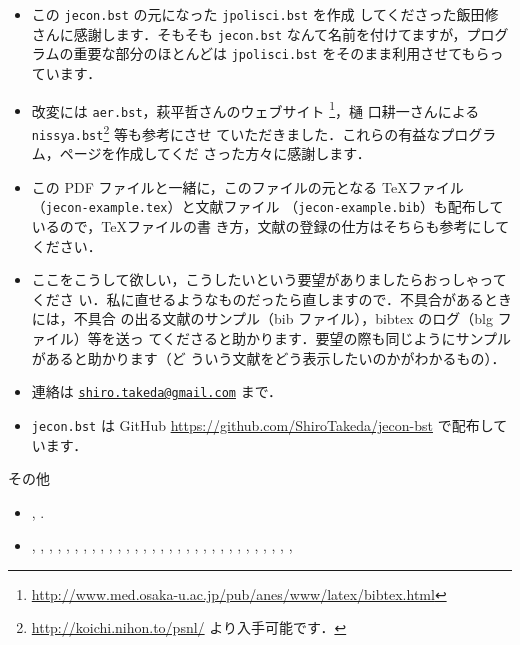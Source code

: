 \documentclass[article]{jlreq}
\begin{document}
\begin{itemize}
 \item この \texttt{jecon.bst} の元になった \texttt{jpolisci.bst} を作成
       してくださった飯田修さんに感謝します．そもそも \texttt{jecon.bst} 
       なんて名前を付けてますが，プログラムの重要な部分のほとんどは
       \texttt{jpolisci.bst} をそのまま利用させてもらっています．
 \item 改変には \texttt{aer.bst}，萩平哲さんのウェブサイト
       \footnote{
       \url{http://www.med.osaka-u.ac.jp/pub/anes/www/latex/bibtex.html}}，樋
       口耕一さんによる \texttt{nissya.bst}\footnote{
       \url{http://koichi.nihon.to/psnl/} より入手可能です．} 等も参考にさせ
       ていただきました．これらの有益なプログラム，ページを作成してくだ
       さった方々に感謝します．
 \item この PDF ファイルと一緒に，このファイルの元となる \TeX ファイル 
      （\texttt{jecon-example.tex}）と文献ファイル 
      （\texttt{jecon-example.bib}）も配布しているので，\TeX ファイルの書
       き方，文献の登録の仕方はそちらも参考にしてください．
 \item ここをこうして欲しい，こうしたいという要望がありましたらおっしゃってくださ
       い．私に直せるようなものだったら直しますので．不具合があるときには，不具合
       の出る文献のサンプル（bib ファイル），bibtex のログ（blg ファイル）等を送っ
       てくださると助かります．要望の際も同じようにサンプルがあると助かります（ど
       ういう文献をどう表示したいのかがわかるもの）．
 \item 連絡は \texttt{\href{mailto:shiro.takeda@gmail.com}{shiro.takeda@gmail.com}} まで．
 \item \texttt{jecon.bst} は GitHub
       \url{https://github.com/ShiroTakeda/jecon-bst} で配布しています．
\end{itemize}

\nocite{*}

その他
\begin{itemize}
 \item \citet{zhang2016Deep}, \citet{imbens2019Optimized}.
\end{itemize}

\begin{itemize}
 \item \citet{sample-test2},
\citet{sample-test},
\citet{oo100:_no_title},
\citet{oo99:_no_title},
\citet{120005678435},
\citet{120005614155},
\citet{Krey2014},
\citet{有村-蓬田2012},
\citet{森201206},
\citet{Jaeger2011},
\citet{Ades-2010-EnergyUseand},
\citet{松浦2010a},
\citet{bohringer2007measuring},
\citet{Ahman2007},
\citet{横溝2007},
\citet{Bohringer2006},
\citet{chuokankyo06jp:ccs},
\citet{瀧川2006a},
\citet{bouet06:_is_erosion_of_tarif_prefer_serious_concer},
\citet{Mcconnell2005},
\citet{Stokey2004},
\citet{Loschel2002},
\citet{ihori02:_japa_tax},
\citet{hardle_sweave:_2002},
\citet{nakamura00:_excel_io},
\citet{Iregui-1999-EFFICIENCYGAINSFROM},
\citet{okura96jp:nihon-no-zeisei},
\citet{MaggiRodr'iguez-Clare-1998-ValueofTrade},
\citet{shigen97:_energ_balan},
\citet{内田90},
\citet{samuelson67:_econo_found},
\citet{allais1953}
\end{itemize}


% 
% 

%

% 
\end{document}
